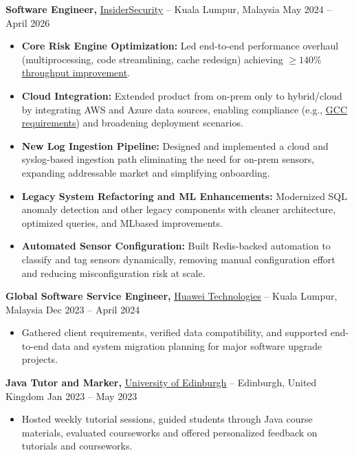 \documentclass[11pt]{article}       %
\begin{document}
\textbf{Software Engineer,} {\href{https://insidersecurity.co/}{\underline{InsiderSecurity}}} -- Kuala Lumpur, Malaysia \hfill May 2024 -- April 2026 \\
\vspace{-9pt}
\begin{itemize}
  \item \textbf{Core Risk Engine Optimization:} Led end-to-end performance overhaul (multiprocessing,
code streamlining, cache redesign) achieving \href{https://minsuan96.github.io/assets/pdf/BNWEngineV4_Results.pdf}{\underline{$\geq 140\%$ throughput improvement}}.
  \item \textbf{Cloud Integration:} Extended product from on-prem only to hybrid/cloud
by integrating AWS and Azure data sources, enabling compliance (e.g., \href{https://www.tech.gov.sg/products-and-services/for-government-agencies/software-development/government-on-commercial-cloud}{\underline{GCC
requirements}}) and broadening deployment scenarios.
  \item \textbf{New Log Ingestion Pipeline:} Designed and implemented a cloud and syslog-based ingestion path eliminating the need for on-prem sensors, expanding addressable market
and simplifying onboarding.
\item \textbf{Legacy System Refactoring and ML Enhancements:} Modernized SQL anomaly detection
and other legacy components with cleaner architecture, optimized queries, and MLbased improvements.
\item \textbf{Automated Sensor Configuration:} Built Redis-backed automation to classify and
tag sensors dynamically, removing manual configuration effort and reducing
misconfiguration risk at scale.
\end{itemize}

\textbf{Global Software Service Engineer,} {\href{https://carrier.huawei.com/en/products/service-and-software/software-business}{\underline{Huawei Technologies}}} -- Kuala Lumpur, Malaysia \hfill Dec 2023 -- April 2024 \\
\vspace{-9pt}
\begin{itemize}
  \item Gathered client requirements, verified data compatibility, and supported end-to-end data and system migration planning for major software upgrade projects.
\end{itemize}

\textbf{Java Tutor and Marker,} {\href{https://www.ed.ac.uk/}{\underline{University of Edinburgh}}} -- Edinburgh, United Kingdom \hfill Jan 2023 -- May 2023 \\
\vspace{-9pt}
\begin{itemize}
  \item Hosted weekly tutorial sessions, guided students through Java course materials, evaluated courseworks and offered personalized feedback on tutorials and courseworks.
\end{itemize}
\end{document}
